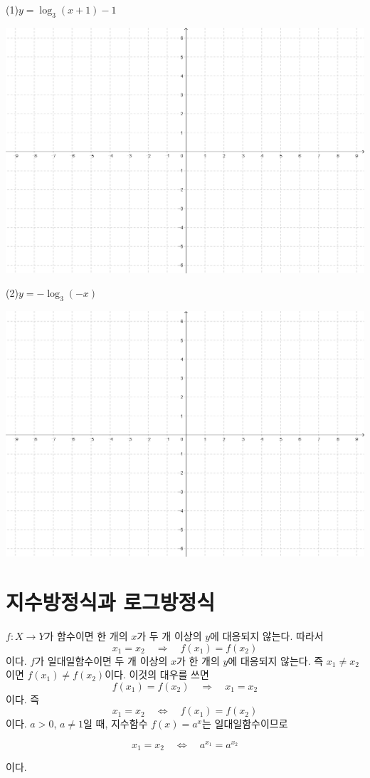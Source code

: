 \documentclass{oblivoir}
\begin{document}
\newpage
%
\label{log6}
\par\noindent
(1)\;\(y=\log_3(x+1)-1\)
\begin{center}
\includegraphics[width=\textwidth]{96grid}
\end{center}
\par\noindent
(2)\;\;\(y=-\log_3(-x)\)
\begin{center}
\includegraphics[width=\textwidth]{96grid}
\end{center}


\section{지수방정식과 로그방정식}
\(f:X\to Y\)가 함수이면 한 개의 \(x\)가 두 개 이상의 \(y\)에 대응되지 않는다.
따라서
\[x_1=x_2\quad\Longrightarrow\quad f(x_1)=f(x_2)\]
이다.
\(f\)가 일대일함수이면 두 개 이상의 \(x\)가 한 개의 \(y\)에 대응되지 않는다.
즉 \(x_1\neq x_2\)이면 \(f(x_1)\neq f(x_2)\)이다.
이것의 대우를 쓰면
\[f(x_1)=f(x_2)\quad\Longrightarrow\quad x_1=x_2\]
이다.
즉
\[x_1=x_2\quad\Longleftrightarrow\quad f(x_1)=f(x_2)\]
이다.
\(a>0\), \(a\neq1\)일 때, 지수함수 \(f(x)=a^x\)는 일대일함수이므로
\begin{mdframed}[innertopmargin=0pt,leftmargin=.23\textwidth,rightmargin=.23\textwidth]
\[x_1=x_2\quad\Longleftrightarrow\quad a^{x_1}=a^{x_2}\]
\end{mdframed}
이다.
\end{document}
